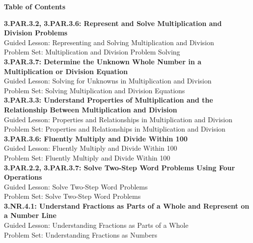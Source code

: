 \documentclass[12pt]{book}
\begin{document}
\begin{center}
    {\LARGE \textbf{Table of Contents}}\\[0.5cm]
\end{center}

\noindent
\textbf{3.PAR.3.2, 3.PAR.3.6: Represent and Solve Multiplication and Division Problems}\\
\hspace*{2em} Guided Lesson: Representing and Solving Multiplication and Division\\
\hspace*{2em} Problem Set: Multiplication and Division Problem Solving\\[0.3cm]

\textbf{3.PAR.3.7: Determine the Unknown Whole Number in a Multiplication or Division Equation}\\
\hspace*{2em} Guided Lesson: Solving for Unknowns in Multiplication and Division\\
\hspace*{2em} Problem Set: Solving Multiplication and Division Equations\\[0.3cm]

\textbf{3.PAR.3.3: Understand Properties of Multiplication and the Relationship Between Multiplication and Division}\\
\hspace*{2em} Guided Lesson: Properties and Relationships in Multiplication and Division\\
\hspace*{2em} Problem Set: Properties and Relationships in Multiplication and Division\\[0.3cm]

\textbf{3.PAR.3.6: Fluently Multiply and Divide Within 100}\\
\hspace*{2em} Guided Lesson: Fluently Multiply and Divide Within 100\\
\hspace*{2em} Problem Set: Fluently Multiply and Divide Within 100\\[0.3cm]

\textbf{3.PAR.2.2, 3.PAR.3.7: Solve Two-Step Word Problems Using Four Operations}\\
\hspace*{2em} Guided Lesson: Solve Two-Step Word Problems\\
\hspace*{2em} Problem Set: Solve Two-Step Word Problems\\[0.3cm]

\textbf{3.NR.4.1: Understand Fractions as Parts of a Whole and Represent on a Number Line}\\
\hspace*{2em} Guided Lesson: Understanding Fractions as Parts of a Whole\\
\hspace*{2em} Problem Set: Understanding Fractions as Numbers\\[0.3cm]

\end{document}

